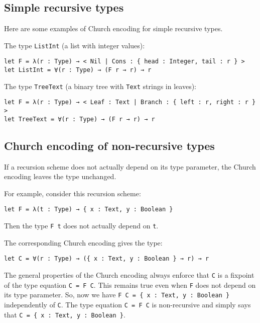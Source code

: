 \subsection{Simple recursive types}


Here are some examples of Church encoding for simple recursive types.


The type \lstinline!ListInt! (a list with integer values):


\begin{lstlisting}[language=Dhall]
let F = λ(r : Type) → < Nil | Cons : { head : Integer, tail : r } >
let ListInt = ∀(r : Type) → (F r → r) → r
\end{lstlisting}


The type \lstinline!TreeText! (a binary tree with \lstinline!Text! strings in leaves):


\begin{lstlisting}[language=Dhall]
let F = λ(r : Type) → < Leaf : Text | Branch : { left : r, right : r } >
let TreeText = ∀(r : Type) → (F r → r) → r
\end{lstlisting}


\subsection{Church encoding of non-recursive types}


If a recursion scheme does not actually depend on its type parameter, the Church encoding leaves the type unchanged.


For example, consider this recursion scheme:


\begin{lstlisting}[language=Dhall]
let F = λ(t : Type) → { x : Text, y : Boolean }
\end{lstlisting}


Then the type \lstinline!F t! does not actually depend on \lstinline!t!.


The corresponding Church encoding gives the type:


\begin{lstlisting}[language=Dhall]
let C = ∀(r : Type) → ({ x : Text, y : Boolean } → r) → r
\end{lstlisting}


The general properties of the Church encoding always enforce that \lstinline!C! is a fixpoint of the type equation \lstinline!C = F C!.
This remains true even when \lstinline!F! does not depend on its type parameter.
So, now we have \lstinline!F C = { x : Text, y : Boolean }! independently of \lstinline!C!.
The type equation \lstinline!C = F C! is non-recursive and simply says that \lstinline!C = { x : Text, y : Boolean }!.


